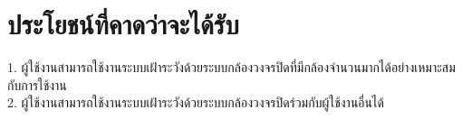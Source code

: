 \section{ประโยชน์ที่คาดว่าจะได้รับ}
1. ผู้ใช้งานสามารถใช้งานระบบเฝ้าระวังด้วยระบบกล้องวงจรปิดที่มีกล้องจำนวนมากได้อย่างเหมาะสมกับการใช้งาน\\
2. ผู้ใช้งานสามารถใช้งานระบบเฝ้าระวังด้วยระบบกล้องวงจรปิดร่วมกับผู้ใช้งานอื่นได้\\